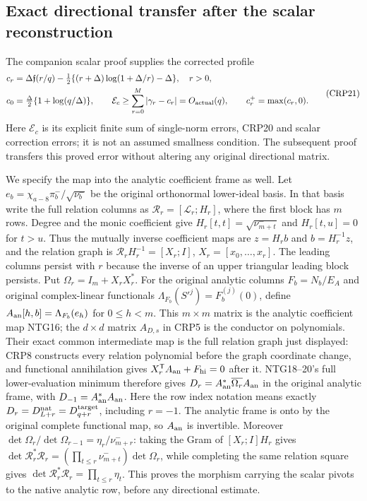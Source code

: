 \documentclass[11pt,a4paper]{article}
\begin{document}
\subsection{Exact directional transfer after the scalar reconstruction}
The companion scalar proof supplies the corrected profile
\[
\begin{split}
c_r&=\Delta\mathfrak f(r/q)
-\tfrac12\{(r+\Delta)\log(1+\Delta/r)-\Delta\},\quad r>0,\\
c_0&=\tfrac\Delta2\{1+\log(q/\Delta)\},\qquad
\mathcal E_c\ge\sum_{r=0}^M|\gamma_r-c_r|
 =O_{\rm actual}(q),\qquad c_r^+=\max(c_r,0).
\end{split}\tag{CRP21}
\]
Here $\mathcal E_c$ is its explicit finite sum of single-norm errors,
CRP20 and scalar correction errors; it is not an assumed smallness
condition. The subsequent proof transfers this proved error without
altering any original directional matrix.

We specify the map into the analytic coefficient frame as well. Let
$e_b=\chi_{a-8}\pi_b^-/\sqrt{\nu_b^-}$ be the original orthonormal
lower-ideal basis. In that basis write the full relation columns as
$\mathcal R_r=[\mathcal L_r;H_r]$, where the first block has $m$ rows.
Degree and the monic coefficient give
$H_r[t,t]=\sqrt{\nu^-_{m+t}}$ and $H_r[t,u]=0$ for $t>u$.
Thus the mutually inverse coefficient maps are $z=H_rb$ and
$b=H_r^{-1}z$, and the relation graph is
$\mathcal R_rH_r^{-1}=[X_r;I]$, $X_r=[x_0,\ldots,x_r]$.
The leading columns persist with $r$ because the inverse of an upper
triangular leading block persists. Put $\Omega_r=I_m+X_rX_r^*$.
For the original analytic columns $F_b=N_b/E_A$ and original
complex-linear functionals $\Lambda_{F_b}(S'^j)=F_b^{(j)}(0)$, define
$A_{\rm an}[h,b]=\Lambda_{F_b}(e_h)$ for $0\le h<m$.
This $m\times m$ matrix is the analytic coefficient map NTG16; the
$d\times d$ matrix $A_{D,s}$ in CRP5 is the conductor on polynomials.
Their exact common intermediate map is the full relation graph just
displayed: CRP8 constructs every relation polynomial before the
graph coordinate change, and functional annihilation gives
$X_r^{\mathsf T}A_{\rm an}+F_{\rm hi}=0$ after it.
NTG18--20's full lower-evaluation minimum therefore gives
$D_r=A_{\rm an}^*\overline{\Omega_r}A_{\rm an}$ in the original
analytic frame, with $D_{-1}=A_{\rm an}^*A_{\rm an}$.
Here the row index notation means exactly
$D_r=D^{\rm nat}_{L+r}=D^{\rm target}_{q+r}$, including $r=-1$.
The analytic frame is onto by the original complete functional map,
so $A_{\rm an}$ is invertible. Moreover
$\det\Omega_r/\det\Omega_{r-1}=\eta_r/\nu^-_{m+r}$: taking the
Gram of $[X_r;I]H_r$ gives
$\det\mathcal R_r^*\mathcal R_r=(\prod_{t\le r}\nu^-_{m+t})\det\Omega_r$,
while completing the same relation square gives
$\det\mathcal R_r^*\mathcal R_r=\prod_{t\le r}\eta_t$.
This proves the morphism carrying the scalar pivots to the native
analytic row, before any directional estimate.
\end{document}
